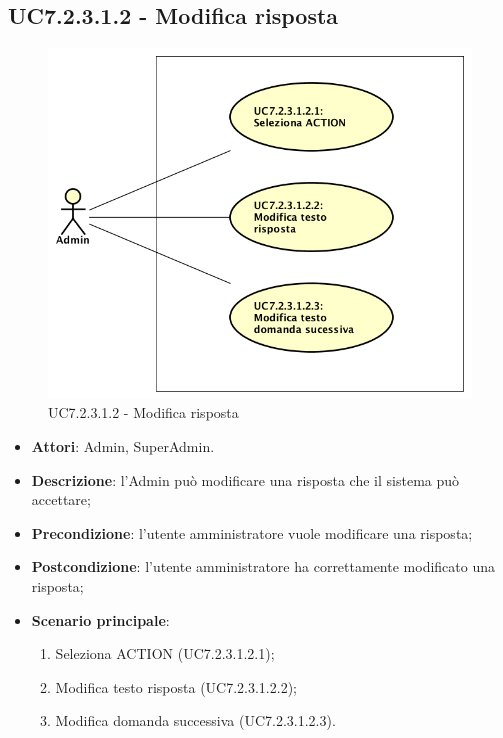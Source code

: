 \documentclass[../AnalisiDeiRequisiti_v4.0.0.tex]{subfiles}
\begin{document}
\subsection{UC7.2.3.1.2 - Modifica risposta} 
\label{sssec:UC7.2.3.1.2} 
\begin{figure}[!h]
	\centering
	\includegraphics[scale=0.7]{UseCases/UC7_GestionePannelloAdmin/UC7_2_GestioneDomande/UC7_2_3_ModificaDomanda/UC7_2_3_1_GestioneRisposte/UC7_2_3_1_2_ModificaRisposta/UC7_2_3_1_2_ModificaRisposta.png}
	\caption{UC7.2.3.1.2 - Modifica risposta}
\end{figure}
\begin{itemize} 
\item \textbf{Attori}: Admin, SuperAdmin.
\item \textbf{Descrizione}: l'Admin può modificare una risposta che il sistema può accettare;
\item \textbf{Precondizione}: l'utente amministratore vuole modificare una risposta;
\item \textbf{Postcondizione}: l'utente amministratore ha correttamente modificato una risposta;
\item \textbf{Scenario principale}: \begin{enumerate}\item Seleziona ACTION (UC7.2.3.1.2.1);\item Modifica testo risposta (UC7.2.3.1.2.2);\item Modifica domanda successiva (UC7.2.3.1.2.3).
\end{enumerate}
\end{itemize} 
\end{document}
